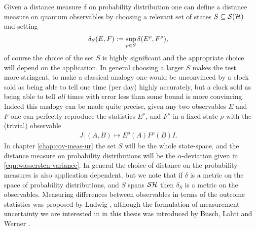 Given a distance measure $\delta$ on probability distribution one can define a distance measure on quantum observables by choosing a relevant set of states $S\subseteq \dops[\hcal]$ and setting
\begin{align}
  \delta_S(E, F) := \sup_{\rho\in S} \delta(E^\rho, F^\rho),
\end{align}
of course the choice of the set $S$ is highly significant and the appropriate choice will depend on the application. In general choosing a larger $S$ makes the test more stringent, to make a classical analogy one would be unconvinced by a clock sold as being able to tell one time (per day) highly accurately, but a clock sold as being able to tell \emph{all} times with error less than some bound is more convincing. Indeed this analogy can be made quite precise, given any two observables $E$ and $F$ one can perfectly reproduce the statistics $E^\rho$, and $F^\rho$ in a fixed state $\rho$ with the (trivial) observable
\begin{align}
  J: (A,B) \mapsto E^\rho(A) F^\rho(B) I.
\end{align}
In chapter \ref{chap:cov-meas-ur} the set $S$ will be the whole state-space, and the distance measure on probability distributions will be the  $\alpha$-deviation given in \eqref{eqn:wassersten-variance}. In general the choice of distance on the probability measures is also application dependent, but we note that if $\delta$ is a metric on the space of probability distributions, and $S$ spans $\dops{\hcal}$ then $\delta_S$ is a metric on the observables. Measuring differences between observables in terms of the outcome statistics was proposed by Ludwig \cite{ludwig-foundations-of-qm}, although the formulation of measurement uncertainty we are interested in in this thesis was introduced by Busch, Lahti and Werner \cite{blw-meas-uncertainty}.






